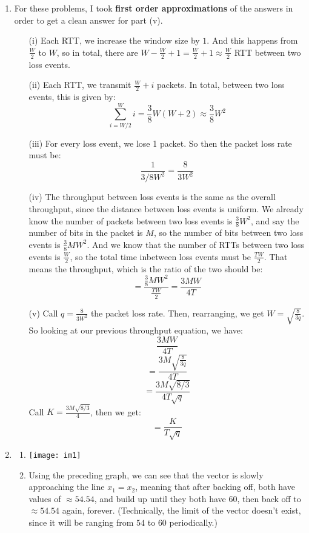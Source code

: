 \begin{enumerate}
\begin{enumerate}
    \end{enumerate}
  \item For these problems, I took \textbf{first order approximations} of the answers in order to get a clean answer for part (v).
    \begin{enumerate}
      \item [(i)] Each RTT, we increase the window size by $1$. And this happens from $\frac{W}{2}$ to $W$, so in total, there are $W - \frac{W}{2} + 1 = \frac{W}{2} + 1 \approx \frac{W}{2}$ RTT between two loss events.
      \item [(ii)] Each RTT, we transmit $\frac{W}{2} + i$ packets. In total, between two loss events, this is given by:
        $$\sum_{i=W/2}^{W} i = \frac{3}{8}W(W+2) \approx \frac{3}{8}W^2$$
      \item [(iii)] For every loss event, we lose 1 packet. So then the packet loss rate must be:
        $$\frac{1}{3/8 W^2} = \frac{8}{3W^2}$$
      \item [(iv)] The throughput between loss events is the same as the overall throughput, since the distance between loss events is uniform. We already know the number of packets between two loss events is $\frac{3}{8}W^2$, and say the number of bits in the packet is $M$, so the number of bits between two loss events is $\frac{3}{8}MW^2$. And we know that the number of RTTs between two loss events is $\frac{W}{2}$, so the total time inbetween loss events must be $\frac{TW}{2}$. That means the throughput, which is the ratio of the two should be:
        $$=\frac{\frac{3}{8}MW^2}{\frac{TW}{2}} = \frac{3MW}{4T}$$
      \item [(v)] Call $q = \frac{8}{3W^2}$ the packet loss rate. Then, rearranging, we get $W = \sqrt{\frac{8}{3q}}$. So looking at our previous throughput equation, we have:
        $$\frac{3MW}{4T}$$
        $$=\frac{3M\sqrt{\frac{8}{3q}}}{4T}$$
        $$=\frac{3M\sqrt{8/3}}{4T \sqrt{q}}$$
        Call $K = \frac{3M \sqrt{8/3}}{4}$, then we get:
        $$=\frac{K}{T \sqrt{q}}$$
    \end{enumerate}

  \item 
    \begin{enumerate}
      \item 
        \texttt{[image: im1]}
      \item Using the preceding graph, we can see that the vector is slowly approaching the line $x_1=x_2$, meaning that after backing off, both have values of $\approx 54.54$, and build up until they both have $60$, then back off to $\approx 54.54$ again, forever. (Technically, the limit of the vector doesn't exist, since it will be ranging from $54$ to $60$ periodically.)
    \end{enumerate}


\end{enumerate}
